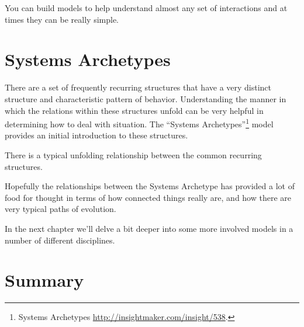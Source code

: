 \documentclass[]{memoir}
\begin{document}
You can build models to help understand almost any set of interactions
and at times they can be really simple.

\section{Systems Archetypes}

There are a set of frequently recurring structures that have a very
distinct structure and characteristic pattern of behavior. Understanding
the manner in which the relations within these structures unfold can be
very helpful in determining how to deal with situation. The ``Systems
Archetypes''\footnote{Systems Archetypes
  \url{http://insightmaker.com/insight/538}.} model provides an initial
introduction to these structures.

\FloatBarrier 

\begin{model}[frametitle={Model: Systems Archetypes}] 

 There is a typical unfolding relationship between the common recurring structures.




 \end{model}

Hopefully the relationships between the Systems Archetype has provided a
lot of food for thought in terms of how connected things really are, and
how there are very typical paths of evolution.

In the next chapter we'll delve a bit deeper into some more involved
models in a number of different disciplines.

\section{Summary}
\end{document}
